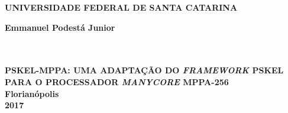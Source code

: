 \thispagestyle{empty}

\vfill
 \begin{center}
    

    {\large\bfseries UNIVERSIDADE FEDERAL DE SANTA CATARINA} \\
    
   
    \vspace*{1in}
    \begin{large} \bfseries Emmanuel Podestá Junior \end{large}\\[0.4in]

    \vspace*{4cm}
    \noindent \\
    
    \large\bfseries{PSKEL-MPPA: UMA ADAPTAÇÃO DO \textit{FRAMEWORK} PSKEL PARA O PROCESSADOR \textit{MANYCORE} MPPA-256} \\
    \vfill
    \large\bfseries{ Florianópolis \\ 2017}
\end{center}

\normalsize


